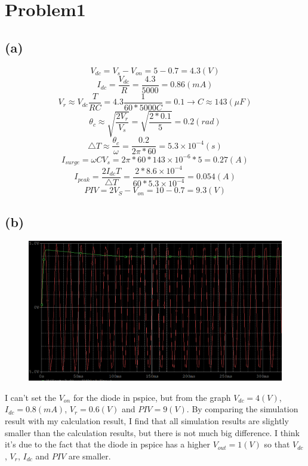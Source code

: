 \documentclass[12pt]{article}
\begin{document}
\newpage
\section{Problem1}
\subsection{(a)}
$$V_{dc}=V_s-V_{on}=5-0.7=4.3(V)$$
$$I_{dc}=\frac{V_{dc}}{R}=\frac{4.3}{5000}=0.86(mA)$$
$$V_r\approx V_{dc}\frac{T}{RC}=4.3\frac{1}{60*5000C}=0.1\rightarrow C\approx143(\mu F)$$
$$\theta_c\approx \sqrt{\frac{2V_r}{V_s}}=\sqrt{\frac{2*0.1}{5}}=0.2(rad)$$
$$\triangle T\approx \frac{\theta_c}{\omega}=\frac{0.2}{2\pi *60}=5.3\times10^{-4}(s)$$
$$I_{surge}=\omega C V_s=2\pi *60*143\times10^{-6}*5=0.27(A)$$
$$I_{peak}=\frac{2I_{dc}T}{\triangle T}=\frac{2*8.6\times10^{-4}}{60*5.3\times10^{-4}}=0.054(A)$$
$$PIV=2V_S-V_{on}=10-0.7=9.3(V)$$
\subsection{(b)}
\begin{figure}[H]
\centering
\includegraphics[scale=0.3]{P1.png}
\end{figure}
I can't set the $V_{on}$ for the diode in pspice, but from the graph $V_{dc}=4(V)$, $I_{dc}=0.8(mA)$, $V_r=0.6(V)$ and $PIV=9(V)$. By comparing the simulation result with my calculation result, I find that all simulation results are slightly smaller than the calculation results, but there is not much big difference. I think it's due to the fact that the diode in pspice has a higher $V_{out}=1(V)$ so that $V_{dc}$, $V_{r}$, $I_{dc}$ and $PIV$ are smaller. 
\end{document}
